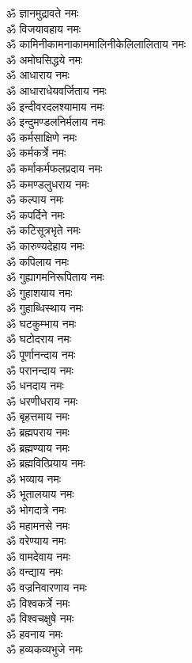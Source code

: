 \begin{multicols}{2}
\begin{flushleft}
ॐ ज्ञानमुद्रावते नमः\\
ॐ विजयावहाय नमः\\
ॐ कामिनी\-कामना\-काममालिनी\-केलिलालिताय नमः\\
ॐ अमोघसिद्धये नमः\\
ॐ आधाराय नमः\\
ॐ आधाराधेयवर्जिताय नमः\\
ॐ इन्दीवरदलश्यामाय नमः\\
ॐ इन्दुमण्डलनिर्मलाय नमः\\
ॐ कर्मसाक्षिणे नमः\\
ॐ कर्मकर्त्रे नमः\hfill{}\\
ॐ कर्माकर्मफलप्रदाय नमः\\
ॐ कमण्डलुधराय नमः\\
ॐ कल्पाय नमः\\
ॐ कपर्दिने नमः\\
ॐ कटिसूत्रभृते नमः\\
ॐ कारुण्यदेहाय नमः\\
ॐ कपिलाय नमः\\
ॐ गुह्यागमनिरूपिताय नमः\\
ॐ गुहाशयाय नमः\\
ॐ गुहाब्धिस्थाय नमः\hfill{}\\
ॐ घटकुम्भाय नमः\\
ॐ घटोदराय नमः\\
ॐ पूर्णानन्दाय नमः\\
ॐ परानन्दाय नमः\\
ॐ धनदाय नमः\\
ॐ धरणीधराय नमः\\
ॐ बृहत्तमाय नमः\\
ॐ ब्रह्मपराय नमः\\
ॐ ब्रह्मण्याय नमः\\
ॐ ब्रह्मवित्प्रियाय नमः\hfill{}\\
ॐ भव्याय नमः\\
ॐ भूतालयाय नमः\\
ॐ भोगदात्रे नमः\\
ॐ महामनसे नमः\\
ॐ वरेण्याय नमः\\
ॐ वामदेवाय नमः\\
ॐ वन्द्याय नमः\\
ॐ वज्रनिवारणाय नमः\\
ॐ विश्वकर्त्रे नमः\\
ॐ विश्वचक्षुषे नमः\hfill{}\\
ॐ हवनाय नमः\\
ॐ हव्यकव्यभुजे नमः\\

\end{flushleft}
\end{multicols}
